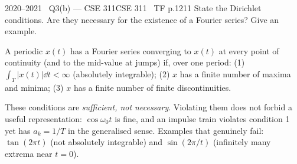 \begin{qcard}{2020--2021 \textbullet\ Q3(b) --- CSE 311}{CSE 311 \textbullet\ TF p.12}{11}
State the Dirichlet conditions. Are they necessary for the existence of a Fourier series? Give an example.
\end{qcard}
\begin{solution}
A periodic $x(t)$ has a Fourier series converging to $x(t)$ at every point of continuity (and to the mid-value at jumps) if, over one period: (1) $\int_T|x(t)|\dd t<\infty$ (absolutely integrable); (2) $x$ has a finite number of maxima and minima; (3) $x$ has a finite number of finite discontinuities.

These conditions are \emph{sufficient, not necessary}. Violating them does not forbid a useful representation: $\cos\omega_0t$ is fine, and an impulse train violates condition 1 yet has $a_k=1/T$ in the generalised sense. Examples that genuinely fail: $\tan(2\pi t)$ (not absolutely integrable) and $\sin(2\pi/t)$ (infinitely many extrema near $t=0$).
\end{solution}

